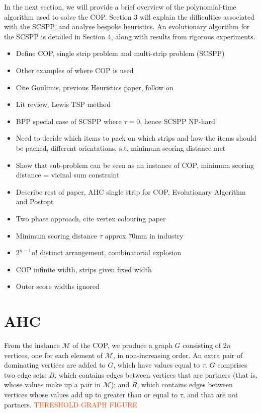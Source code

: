 \documentclass{elsarticle}
\begin{document}
In the next section, we will provide a brief overview of the polynomial-time algorithm used to solve the COP. Section 3 will explain the difficulties associated with the SCSPP, and analyse bespoke heuristics. An evolutionary algorithm for the SCSPP is detailed in Section 4, along with results from rigorous experiments.  

\begin{itemize}
	\item Define COP, single strip problem and multi-strip problem (SCSPP)
	\item Other examples of where COP is used
	\item Cite Goulimis, previous Heuristics paper, follow on
	\item Lit review, Lewis TSP method
	\item BPP special case of SCSPP where $\tau = 0$, hence SCSPP NP-hard
	\item Need to decide which items to pack on which strips and how the items should be packed, different orientations, s.t. minimum scoring distance met
	\item Show that sub-problem can be seen as an instance of COP, minimum scoring distance = vicinal sum constraint
	\item Describe rest of paper, AHC single strip for COP, Evolutionary Algorithm and Postopt
	\item Two phase approach, cite vertex colouring paper
	\item Minimum scoring distance $\tau$ approx 70mm in industry
	\item $2^{n-1} n!$ distinct arrangement, combinatorial explosion
	\item COP infinite width, strips given fixed width
	\item Outer score widths ignored
\end{itemize}


\section{AHC}
\label{sec:ahc}
From the instance $\mathcal{M}$ of the COP, we produce a graph $G$ consisting of $2n$ vertices, one for each element of $\mathcal{M}$, in non-increasing order. An extra pair of dominating vertices are added to $G$, which have values equal to $\tau$. $G$ comprises two edge sets: $B$, which contains edges between vertices that are partners (that is, whose values make up a pair in $\mathcal{M}$); and $R$, which contains edges between vertices whose values add up to greater than or equal to $\tau$, and that are not partners. \textcolor{OrangeRed}{THRESHOLD GRAPH FIGURE}
\end{document}
